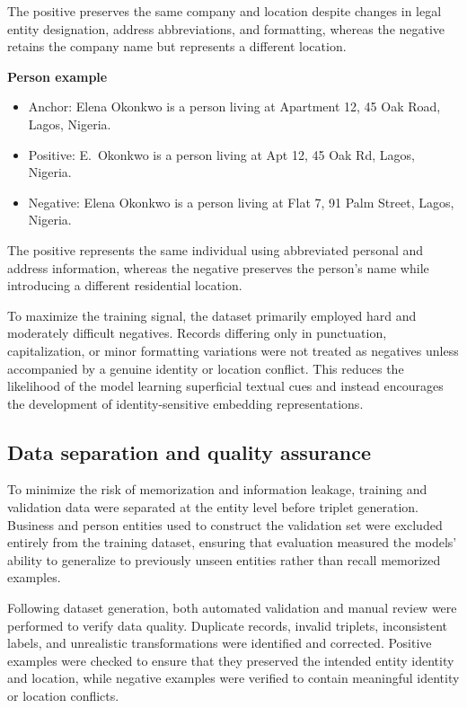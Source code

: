 \documentclass{article}
\begin{document}
The positive preserves the same company and location despite changes in legal entity designation, address abbreviations, and formatting, whereas the negative retains the company name but represents a different location.

\textbf{Person example}
\begin{itemize}
  \item Anchor: Elena Okonkwo is a person living at Apartment 12, 45 Oak Road, Lagos, Nigeria.
  \item Positive: E.\ Okonkwo is a person living at Apt 12, 45 Oak Rd, Lagos, Nigeria.
  \item Negative: Elena Okonkwo is a person living at Flat 7, 91 Palm Street, Lagos, Nigeria.
\end{itemize}

The positive represents the same individual using abbreviated personal and address information, whereas the negative preserves the person's name while introducing a different residential location.

To maximize the training signal, the dataset primarily employed hard and moderately difficult negatives. Records differing only in punctuation, capitalization, or minor formatting variations were not treated as negatives unless accompanied by a genuine identity or location conflict. This reduces the likelihood of the model learning superficial textual cues and instead encourages the development of identity-sensitive embedding representations.

\subsection{Data separation and quality assurance}

To minimize the risk of memorization and information leakage, training and validation data were separated at the entity level before triplet generation. Business and person entities used to construct the validation set were excluded entirely from the training dataset, ensuring that evaluation measured the models' ability to generalize to previously unseen entities rather than recall memorized examples.

Following dataset generation, both automated validation and manual review were performed to verify data quality. Duplicate records, invalid triplets, inconsistent labels, and unrealistic transformations were identified and corrected. Positive examples were checked to ensure that they preserved the intended entity identity and location, while negative examples were verified to contain meaningful identity or location conflicts.
\end{document}
